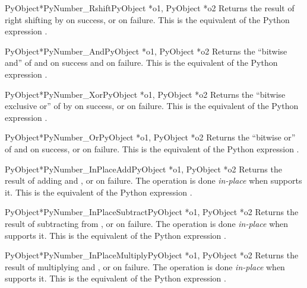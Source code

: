 \documentclass{manual}
\begin{document}
\begin{cfuncdesc}{PyObject*}{PyNumber_Rshift}{PyObject *o1, PyObject *o2}
Returns the result of right shifting  by  on success,
or \NULL{} on failure.  This is the equivalent of the Python
expression .
\end{cfuncdesc}


\begin{cfuncdesc}{PyObject*}{PyNumber_And}{PyObject *o1, PyObject *o2}
Returns the ``bitwise and'' of  and  on success and
\NULL{} on failure. This is the equivalent of the Python expression
.
\end{cfuncdesc}


\begin{cfuncdesc}{PyObject*}{PyNumber_Xor}{PyObject *o1, PyObject *o2}
Returns the ``bitwise exclusive or'' of  by  on success,
or \NULL{} on failure.  This is the equivalent of the Python
expression .
\end{cfuncdesc}

\begin{cfuncdesc}{PyObject*}{PyNumber_Or}{PyObject *o1, PyObject *o2}
Returns the ``bitwise or'' of  and  on success, or
\NULL{} on failure.  This is the equivalent of the Python expression
.
\end{cfuncdesc}


\begin{cfuncdesc}{PyObject*}{PyNumber_InPlaceAdd}{PyObject *o1, PyObject *o2}
Returns the result of adding  and , or \NULL{} on failure. 
The operation is done \emph{in-place} when  supports it.  This is the
equivalent of the Python expression .
\end{cfuncdesc}


\begin{cfuncdesc}{PyObject*}{PyNumber_InPlaceSubtract}{PyObject *o1, PyObject *o2}
Returns the result of subtracting  from , or
\NULL{} on failure.  The operation is done \emph{in-place} when 
supports it.  This is the equivalent of the Python expression .
\end{cfuncdesc}


\begin{cfuncdesc}{PyObject*}{PyNumber_InPlaceMultiply}{PyObject *o1, PyObject *o2}
Returns the result of multiplying  and , or \NULL{} on
failure.  The operation is done \emph{in-place} when  supports it. 
This is the equivalent of the Python expression .
\end{cfuncdesc}
\end{document}
